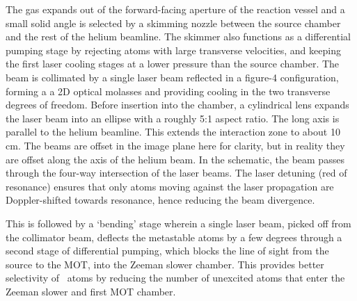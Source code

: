 	The gas expands out of the forward-facing aperture of the reaction vessel and a small solid angle is selected by a skimming nozzle between the source chamber and the rest of the helium beamline.
	The skimmer also functions as a differential pumping stage by rejecting atoms with large transverse velocities, and keeping the first laser cooling stages at a lower pressure than the source chamber.
	The \mhe beam is collimated by a single laser beam reflected in a figure-4 configuration, forming a a 2D optical molasses \cite{Lett81,Rooijakkers96} and providing cooling in the two transverse degrees of freedom.
	Before insertion into the chamber, a cylindrical lens expands the laser beam into an ellipse with a roughly 5:1 aspect ratio. The long axis is parallel to the helium beamline. 
	This extends the interaction zone to about 10 cm. 
	The beams are offset in the image plane here for clarity, but in reality they are offset along the axis of the helium beam.
	In the schematic, the beam passes through the four-way intersection of the laser beams. 
	The laser detuning (red of resonance) ensures that only atoms moving against the laser propagation are Doppler-shifted towards resonance, hence reducing the beam divergence.


	This is followed by a `bending' stage wherein a single laser beam, picked off from the collimator beam, deflects the metastable atoms by a few degrees through a second stage of differential pumping, which blocks the line of sight from the source to the MOT, into the Zeeman slower chamber.
	This provides better selectivity of \mhe~atoms by reducing the number of unexcited atoms that enter the Zeeman slower and first MOT chamber.


